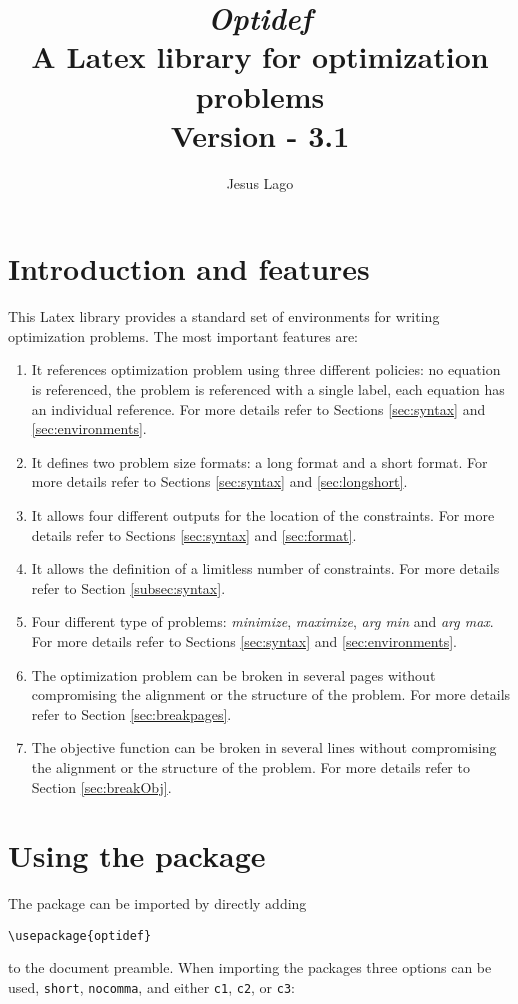 \documentclass[a4paper]{article}
\title{\textit{\textbf{Optidef}} \\ A Latex library for optimization problems\\ \textnormal{Version - 3.1}}
\author{Jesus Lago}
\begin{document}
\maketitle

\newpage

\tableofcontents

\newpage

\section{Introduction and features}

This Latex library provides a standard set of environments for writing optimization problems. The most important features are:
\begin{enumerate}
\item It references optimization problem using three different policies: no equation is referenced, the problem is referenced with a single label, each equation has an individual reference. For more details refer to Sections \ref{sec:syntax} and \ref{sec:environments}.
\item It defines two problem size formats: a long format and a short format. For more details refer to Sections \ref{sec:syntax} and \ref{sec:longshort}.
\item It allows four different outputs for the location of the constraints. For more details refer to Sections \ref{sec:syntax} and \ref{sec:format}.
\item It allows the definition of a limitless number of constraints. For more details refer to Section \ref{subsec:syntax}.
\item Four different type of problems: \textit{minimize}, \textit{maximize}, \textit{arg min} and \textit{arg max}. For more details refer to Sections \ref{sec:syntax} and \ref{sec:environments}.
\item The optimization problem can be broken in several pages without compromising the alignment or the structure of the problem. For more details refer to Section \ref{sec:breakpages}. 
\item The objective function can be broken in several lines without compromising the alignment or the structure of the problem. For more details refer to Section \ref{sec:breakObj}.
\end{enumerate}

\section{Using the package}
The package can be imported by directly adding
\begin{lstlisting}
\usepackage{optidef}
\end{lstlisting}
to the document preamble. When importing the packages three options can be used, \verb|short|, \verb|nocomma|, and either \verb|c1|, \verb|c2|, or \verb|c3|:
\end{document}
